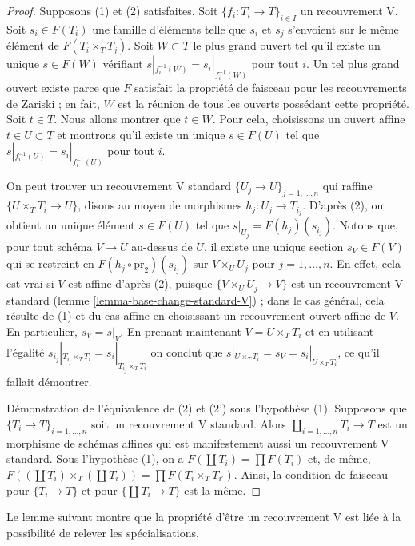 \begin{proof}
Supposons (1) et (2) satisfaites.
Soit $\{f_i : T_i \to T\}_{i \in I}$ un recouvrement V. Soit $s_i \in F(T_i)$
une famille d'éléments telle que $s_i$ et $s_j$ s'envoient sur le même élément
de $F(T_i \times_T T_j)$. Soit $W \subset T$ le plus grand ouvert
tel qu'il existe un unique $s \in F(W)$ vérifiant
$s|_{f_i^{-1}(W)} = s_i|_{f_i^{-1}(W)}$ pour tout $i$.
Un tel plus grand ouvert existe parce que $F$ satisfait la
propriété de faisceau pour les recouvrements de Zariski ; en fait, $W$ est la
réunion de tous les ouverts possédant cette propriété. Soit $t \in T$.
Nous allons montrer que $t \in W$. Pour cela, choisissons un ouvert affine
$t \in U \subset T$ et montrons qu'il existe un unique
$s \in F(U)$ tel que
$s|_{f_i^{-1}(U)} = s_i|_{f_i^{-1}(U)}$ pour tout $i$.

\medskip\noindent
On peut trouver un recouvrement V standard
$\{U_j \to U\}_{j = 1, \ldots, n}$ qui raffine $\{U \times_T T_i \to U\}$,
disons au moyen de morphismes $h_j : U_j \to T_{i_j}$. D'après (2), on obtient un unique élément
$s \in F(U)$ tel que $s|_{U_j} = F(h_j)(s_{i_j})$. Notons que, pour tout
schéma $V \to U$ au-dessus de $U$, il existe une unique section $s_V \in F(V)$
qui se restreint en $F(h_j \circ \text{pr}_2)(s_{i_j})$ sur
$V \times_U U_j$ pour $j = 1, \ldots, n$. En effet, cela est vrai si $V$
est affine d'après (2), puisque $\{V \times_U U_j \to V\}$ est un recouvrement V standard
(lemme \ref{lemma-base-change-standard-V}) ;
dans le cas général, cela résulte de (1) et du cas affine en choisissant un
recouvrement ouvert affine de $V$. En particulier, $s_V = s|_V$.
En prenant maintenant $V = U \times_T T_i$ et en utilisant l'égalité
$s_{i_j}|_{T_{i_j} \times_T T_i} = s_i|_{T_{i_j} \times_T T_i}$
on conclut que $s|_{U \times_T T_i} = s_V = s_i|_{U \times_T T_i}$,
ce qu'il fallait démontrer.

\medskip\noindent
Démonstration de l'équivalence de (2) et (2') sous l'hypothèse (1).
Supposons que $\{T_i \to T\}_{i = 1, \ldots, n}$ soit un recouvrement V standard. Alors
$\coprod_{i = 1, \ldots, n} T_i \to T$ est un morphisme de schémas affines
qui est manifestement aussi un recouvrement V standard.
Sous l'hypothèse (1), on a $F(\coprod T_i) = \prod F(T_i)$
et, de même,
$F((\coprod T_i) \times_T (\coprod T_i)) = \prod F(T_i \times_T T_{i'})$.
Ainsi, la condition de faisceau pour $\{T_i \to T\}$ et pour $\{\coprod T_i \to T\}$
est la même.
\end{proof}

\noindent
Le lemme suivant montre que la propriété d'être un recouvrement V est
liée à la possibilité de relever les spécialisations.

